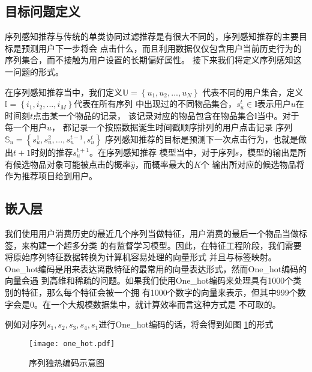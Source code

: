 \subsection{目标问题定义}

序列感知推荐与传统的单类协同过滤推荐是有很大不同的，序列感知推荐的主要目标是预测用户下一步将会%
点击什么，而且利用数据仅仅包含用户当前历史行为的序列集合，而不接触为用户设置的长期偏好属性。%
接下来我们将定义序列感知这一问题的形式。%

在序列感知推荐当中，我们定义$\mathbb{U}= \left \{ u_{1},u_{2},...,u_{N} \right \}\label{eq}$%
代表不同的用户集合，定义$\mathbb{I}= \left \{ i_{1},i_{2},...,i_{M} \right \}$代表在所有序列%
中出现过的不同物品集合，$s_{u}^{t}\in \mathbb{I}$表示用户$u$在时间刻$t$点击某一个物品的记录，%
该记录对应的物品包含在物品集合$\mathbb{I}$当中。对于每一个用户$u$，%
都记录一个按照数据诞生时间戳顺序排列的用户点击记录%
序列$\mathbb{S}_{u}=\left \{ s_{u}^{1},s_{u}^{2},...,s_{u}^{t-1},s_{u}^{t} \right \}$%
序列感知推荐的目标是预测下一次点击行为，也就是做出$t+1$时刻的推荐$s_{u}^{t+1}$。在序列感知推荐%
模型当中，对于序列$s$，模型的输出是所有候选物品对象可能被点击的概率$\hat{y}$，而概率最大的$K$个%
输出所对应的候选物品将作为推荐项目给到用户。%
%
%
%
%

\subsection{嵌入层}

我们使用用户消费历史的最近几个序列当做特征，用户消费的最后一个物品当做标签，来构建一个超多分类%
的有监督学习模型。因此，在特征工程阶段，我们需要将原始序列特征数据转换为计算机容易处理的向量形式%
并且与标签映射。One\_hot编码是用来表达离散特征的最常用的向量表达形式，然而One\_hot编码的向量会遇%
到高维和稀疏的问题。如果我们使用One\_hot编码来处理具有1000个类别的特征，那么每个特征会被一个拥%
有1000个数字的向量来表示，但其中999个数字会是0。在一个大规模数据集中，就计算效率而言这种方式是%
不可取的。

例如对序列$s_{1},s_{2},s_{3},s_{4},s_{1}$进行One\_hot编码的话，将会得到如图%
\ref{fig:one_hot}的形式
\begin{figure}[htb]
  \centering
  \texttt{[image: one\_hot.pdf]}\\
  \caption{序列独热编码示意图}
  \label{fig:one_hot}
\end{figure}


